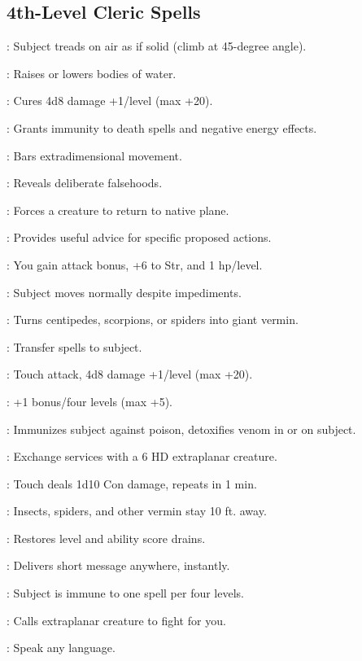 \begin{multicols}{2}
\subsection{4th-Level Cleric Spells}
\begin{description*}
\item[\linkspell{Air Walk}:] Subject treads on air as if solid (climb at 45-degree angle).
\item[\linkspell{Control Water}:] Raises or lowers bodies of water.
\item[\linkspell{Cure Critical Wounds}:] Cures 4d8 damage +1/level (max +20).
\item[\linkspell{Death Ward}:] Grants immunity to death spells and negative energy effects.
\item[\linkspell{Dimensional Anchor}:] Bars extradimensional movement.
\item[\linkspell{Discern Lies}:] Reveals deliberate falsehoods.
\item[\linkspell{Dismissal}:] Forces a creature to return to native plane.
\item[\linkspell{Divination}:] Provides useful advice for specific proposed actions.
\item[\linkspell{Divine Power}:] You gain attack bonus, +6 to Str, and 1 hp/level.
\item[\linkspell{Freedom of Movement}:] Subject moves normally despite impediments.
\item[\linkspell{Giant Vermin}:] Turns centipedes, scorpions, or spiders into giant vermin.
\item[\linkspell{Imbue with Spell Ability}:] Transfer spells to subject.
\item[\linkspell{Inflict Critical Wounds}:] Touch attack, 4d8 damage +1/level (max +20).
\item[\linkspell{Magic Weapon, Greater}:] +1 bonus/four levels (max +5).
\item[\linkspell{Neutralize Poison}:] Immunizes subject against poison, detoxifies venom in or on subject.
\item[\linkspell{Planar Ally, Lesser}:] Exchange services with a 6 HD extraplanar creature.
\item[\linkspell{Poison}:] Touch deals 1d10 Con damage, repeats in 1 min.
\item[\linkspell{Repel Vermin}:] Insects, spiders, and other vermin stay 10 ft. away.
\item[\linkspell{Restoration}:] Restores level and ability score drains.
\item[\linkspell{Sending}:] Delivers short message anywhere, instantly.
\item[\linkspell{Spell Immunity}:] Subject is immune to one spell per four levels.
\item[\linkspell{Summon Monster IV}:] Calls extraplanar creature to fight for you.
\item[\linkspell{Tongues}:] Speak any language.
\end{description*}


\end{multicols}
